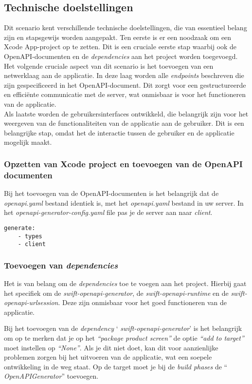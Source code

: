 \subsection{Technische doelstellingen}
Dit scenario kent verschillende technische doelstellingen, die van essentieel belang zijn en stapsgewijs worden aangepakt. Ten eerste is er een noodzaak om een Xcode App-project op te zetten. Dit is een cruciale eerste stap waarbij ook de OpenAPI-documenten en de \textit{dependencies} aan het project worden toegevoegd. 
 \\
Het volgende cruciale aspect van dit scenario is het toevoegen van een netwerklaag aan de applicatie. In deze laag worden alle \textit{endpoints} beschreven die zijn gespecificeerd in het OpenAPI-document. Dit zorgt voor een gestructureerde en efficiënte communicatie met de server, wat onmisbaar is voor het functioneren van de applicatie.
 \\
Als laatste worden de gebruikersinterfaces ontwikkeld, die belangrijk zijn voor het weergeven van de functionaliteiten van de applicatie aan de gebruiker. Dit is een belangrijke stap, omdat het de interactie tussen de gebruiker en de applicatie mogelijk maakt.

\subsubsection{Opzetten van Xcode project en toevoegen van de OpenAPI documenten}
Bij het toevoegen van de OpenAPI-documenten is het belangrijk dat de \textit{openapi.yaml} bestand identiek is, met het \textit{openapi.yaml} bestand in uw server. In het \textit{openapi-generator-config.yaml} file pas je de server aan naar \textit{client}. 

\begin{lstlisting}[caption=openapi-generator-config.yaml client file]
    generate:
    - types
    - client
\end{lstlisting}

\subsubsection{Toevoegen van \textit{dependencies}}
Het is van belang om de \textit{dependencies} toe te voegen aan het project. Hierbij gaat het specifiek om de  \textit{swift-openapi-generator}, de  \textit{swift-openapi-runtime} en de  \textit{swift-openapi-urlsession}. Deze zijn onmisbaar voor het goed functioneren van de applicatie.

Bij het toevoegen van de \textit{dependency} ‘ \textit{swift-openapi-generator}’ is het belangrijk om op te merken dat je op het \textit{“package product screen”} de optie \textit{“add to target”} moet instellen op \textit{“None”}. Als je dit niet doet, kan dit voor aanzienlijke problemen zorgen bij het uitvoeren van de applicatie, wat een soepele ontwikkeling in de weg staat. Op de target moet je bij de \textit{build phases} de “ \textit{OpenAPIGenerator}” toevoegen. 

